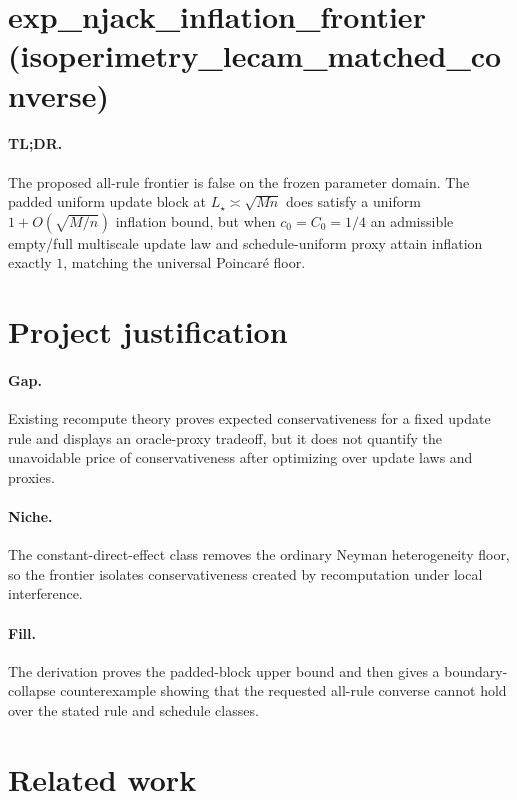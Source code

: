 \documentclass{article}
\begin{document}
\section*{exp\_njack\_inflation\_frontier (isoperimetry\_lecam\_matched\_converse)}

\paragraph{TL;DR.} The proposed all-rule frontier is false on the frozen parameter domain. The padded uniform update block at \(L_\star\asymp\sqrt{Mn}\) does satisfy a uniform \(1+O(\sqrt{M/n})\) inflation bound, but when \(c_0=C_0=1/4\) an admissible empty/full multiscale update law and schedule-uniform proxy attain inflation exactly \(1\), matching the universal Poincar\'e floor.

\section{Project justification}

\paragraph{Gap.} Existing recompute theory proves expected conservativeness for a fixed update rule and displays an oracle-proxy tradeoff, but it does not quantify the unavoidable price of conservativeness after optimizing over update laws and proxies.

\paragraph{Niche.} The constant-direct-effect class removes the ordinary Neyman heterogeneity floor, so the frontier isolates conservativeness created by recomputation under local interference.

\paragraph{Fill.} The derivation proves the padded-block upper bound and then gives a boundary-collapse counterexample showing that the requested all-rule converse cannot hold over the stated rule and schedule classes.

\section{Related work}
\end{document}
